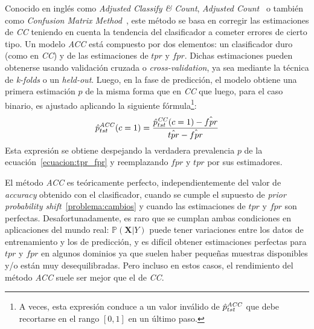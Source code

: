 Conocido en inglés como {\it Adjusted Classify \& Count}, {\it Adjusted
Count\/}~\cite{forman2008quantifying} o también como {\it Confusion Matrix
Method\/}~\cite{saerens2002adjusting}, este método se basa en corregir las
estimaciones de {\it CC\/} teniendo en cuenta la tendencia del clasificador a
cometer errores de cierto tipo. Un modelo {\it ACC\/} está compuesto por dos
elementos: un clasificador duro (como en {\it CC\/}) y de las estimaciones de
\(tpr\) y \(fpr\). Dichas estimaciones pueden obtenerse usando validación
cruzada o {\it cross-validation}, ya sea mediante la técnica de {\it k-folds\/}
o un {\it held-out}. Luego, en la fase de predicción, el modelo obtiene una
primera estimación \(\hat p\) de la misma forma que en {\it CC\/} que luego,
para el caso binario, es ajustado aplicando la siguiente fórmula\footnote{A
veces, esta expresión conduce a un valor inválido de \(\hat p^{\it
ACC\/}_{tst}\) que debe recortarse en el rango \([0, 1]\) en un último paso.}:
\begin{equation}
    \hat p^{\it ACC\/}_{tst}(c=1) = \frac{\hat p^{\it CC\/}_{tst}(c=1)-\hat{fpr}}{\hat{tpr} - \hat{fpr}}\label{ecuacion:acc_binaria}
\end{equation}
Esta expresión se obtiene despejando la verdadera prevalencia \(p\) de la
ecuación~\ref{ecuacion:tpr_fpr} y reemplazando \(fpr\) y \(tpr\) por sus
estimadores.

El método {\it ACC\/} es teóricamente perfecto, independientemente del valor de
{\it accuracy\/} obtenido con el clasificador, cuando se cumple el supuesto de
{\it prior probability shift\/}~\ref{problema:cambios} y cuando las estimaciones
de \(tpr\) y \(fpr\) son perfectas. Desafortunadamente, es raro que se cumplan
ambas condiciones en aplicaciones del mundo real:
\(\mathbb{P}(\boldsymbol{X}|Y)\) puede tener variaciones entre los datos de
entrenamiento y los de predicción, y es difícil obtener estimaciones perfectas
para \(tpr\) y \(fpr\) en algunos dominios ya que suelen haber pequeñas muestras
disponibles y/o están muy desequilibradas. Pero incluso en estos casos, el
rendimiento del método {\it ACC\/} suele ser mejor que el de {\it CC}.

